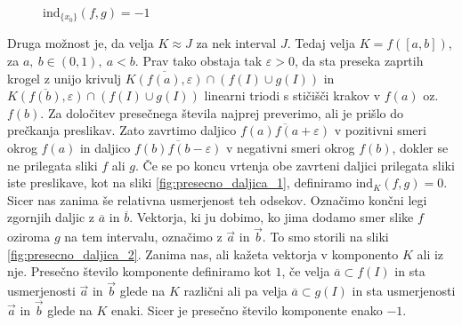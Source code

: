 \documentclass[mat1]{fmfdelo}
\newcommand{\ind}[3][]{\text{ind}_{#1}(#2, #3)}
\begin{document}
\begin{figure}[h!]
\begin{minipage}{0.5\textwidth}
	\centering
	\caption{$\ind[\{x_0\}]{f}{g} = 0$}
	\label{fig:presecno_tocka_1}
\end{minipage}\hfill
\begin{minipage}{0.5\textwidth}
	\centering
	\caption{$\ind[\{x_0\}]{f}{g} = -1$}
	\label{fig:presecno_tocka_2}
\end{minipage}
\end{figure}

Druga možnost je, da velja $K \approx J$ za nek interval $J$. Tedaj velja $K = f([a, b])$, za $a,\ b \in (0, 1),\ a < b.$ Prav tako obstaja tak $\varepsilon > 0$, da sta preseka zaprtih krogel z unijo krivulj $\overline{K(f(a), \varepsilon)} \cap (f(I) \cup g(I))$ in $\overline{K(f(b), \varepsilon)} \cap (f(I) \cup g(I))$ linearni triodi s stičišči krakov v $f(a)$ oz. $f(b).$ Za določitev presečnega števila najprej preverimo, ali je prišlo do prečkanja preslikav. Zato zavrtimo daljico $\overline{f(a)f(a+\varepsilon)}$ v pozitivni smeri okrog $f(a)$ in daljico $\overline{f(b)f(b-\varepsilon)}$ v negativni smeri okrog $f(b)$, dokler se ne prilegata sliki $f$ ali $g$. Če se po koncu vrtenja obe zavrteni daljici prilegata sliki iste preslikave, kot na sliki \ref{fig:presecno_daljica_1}, definiramo $\ind[K]{f}{g} = 0.$ Sicer nas zanima še relativna usmerjenost teh odsekov. Označimo končni legi zgornjih daljic z $\overline{a}$ in $\overline{b}$. Vektorja, ki ju dobimo, ko jima dodamo smer slike $f$ oziroma $g$ na tem intervalu, označimo z $\overrightarrow{a}$ in $\overrightarrow{b}$. To smo storili na sliki \ref{fig:presecno_daljica_2}. Zanima nas, ali kažeta vektorja v komponento $K$ ali iz nje. Presečno število komponente definiramo kot $1$, če velja $\overline{a} \subset f(I)$ in sta usmerjenosti $\overrightarrow{a}$ in $\overrightarrow{b}$ glede na $K$ različni ali pa velja $\overline{a} \subset g(I)$ in sta usmerjenosti $\overrightarrow{a}$ in $\overrightarrow{b}$ glede na $K$ enaki. Sicer je presečno število komponente enako $-1$. 
\end{document}
